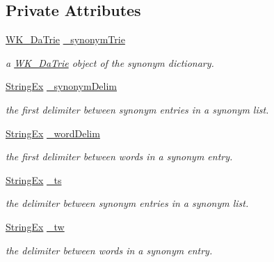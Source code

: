 \subsection*{Private Attributes}
\begin{CompactItemize}
\item 
\hyperlink{classkmaOrange_1_1WK__DaTrie}{WK\_\-DaTrie} \hyperlink{classkmaOrange_1_1SynonymContainer_a018e277349ba2dc83623bd8b86dfcc0}{\_\-synonymTrie}
\begin{CompactList}\small\item\em a \hyperlink{classkmaOrange_1_1WK__DaTrie}{WK\_\-DaTrie} object of the synonym dictionary. \item\end{CompactList}\item 
\hyperlink{classStringEx}{StringEx} \hyperlink{classkmaOrange_1_1SynonymContainer_9a333e812f4d65777c358e96370c6d59}{\_\-synonymDelim}
\begin{CompactList}\small\item\em the first delimiter between synonym entries in a synonym list. \item\end{CompactList}\item 
\hyperlink{classStringEx}{StringEx} \hyperlink{classkmaOrange_1_1SynonymContainer_1d7f4e1537f92654087c85968f1f11ca}{\_\-wordDelim}
\begin{CompactList}\small\item\em the first delimiter between words in a synonym entry. \item\end{CompactList}\item 
\hyperlink{classStringEx}{StringEx} \hyperlink{classkmaOrange_1_1SynonymContainer_82b68d5f1bb2d6ee90c2823cc4e780a7}{\_\-ts}
\begin{CompactList}\small\item\em the delimiter between synonym entries in a synonym list. \item\end{CompactList}\item 
\hyperlink{classStringEx}{StringEx} \hyperlink{classkmaOrange_1_1SynonymContainer_88b0c5b78080af8bdfe304a60486515a}{\_\-tw}
\begin{CompactList}\small\item\em the delimiter between words in a synonym entry. \item\end{CompactList}\end{CompactItemize}


